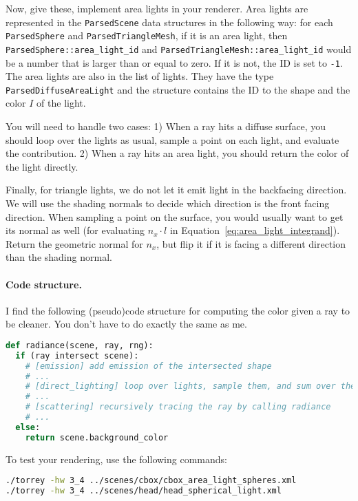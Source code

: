 Now, give these, implement area lights in your renderer. Area lights are represented in the \lstinline{ParsedScene} data structures in the following way: for each \lstinline{ParsedSphere} and \lstinline{ParsedTriangleMesh}, if it is an area light, then \lstinline{ParsedSphere::area_light_id} and \lstinline{ParsedTriangleMesh::area_light_id} would be a number that is larger than or equal to zero. If it is not, the ID is set to \lstinline{-1}. The area lights are also in the list of lights. They have the type \lstinline{ParsedDiffuseAreaLight} and the structure contains the ID to the shape and the color $I$ of the light.

You will need to handle two cases: 1) When a ray hits a diffuse surface, you should loop over the lights as usual, sample a point on each light, and evaluate the contribution. 2) When a ray hits an area light, you should return the color of the light directly.

Finally, for triangle lights, we do not let it emit light in the backfacing direction. We will use the shading normals to decide which direction is the front facing direction. When sampling a point on the surface, you would usually want to get its normal as well (for evaluating $n_x \cdot l$ in Equation~\eqref{eq:area_light_integrand}). Return the geometric normal for $n_x$, but flip it if it is facing a different direction than the shading normal.

\paragraph{Code structure.} I find the following (pseudo)code structure for computing the color given a ray to be cleaner. You don't have to do exactly the same as me.
\begin{lstlisting}[language=python]
def radiance(scene, ray, rng):
  if (ray intersect scene):
    # [emission] add emission of the intersected shape
    # ...
    # [direct_lighting] loop over lights, sample them, and sum over their contributions
    # ...
    # [scattering] recursively tracing the ray by calling radiance
    # ...
  else:
    return scene.background_color
\end{lstlisting}

To test your rendering, use the following commands:
\begin{lstlisting}[language=bash]
./torrey -hw 3_4 ../scenes/cbox/cbox_area_light_spheres.xml
./torrey -hw 3_4 ../scenes/head/head_spherical_light.xml
\end{lstlisting}

